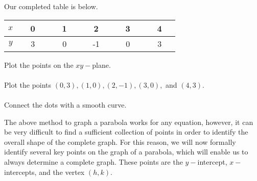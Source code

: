 \documentclass[12pt]{book}
\theoremstyle{definition}
\begin{document}
\begin{multicols}{2}
Our completed table is below.
\begin{center}
	\begin{tabular}{|c|c|c|c|c|c|}
	\hline 
	$x$ & ~~0~~ & ~~1~~ & ~~2~~ & ~~3~~ & ~~4~~\\
	\hline 
	$y$ & 3 & 0 & -1 & 0 & 3\\
	\hline
	\end{tabular}
\end{center}
  Plot the points on the $xy-$plane.\\
~\\
Plot the points $(0, 3), (1, 0), (2, - 1), (3, 0),$ and $(4, 3)$.\\
~\\
Connect the dots with a smooth curve.

\columnbreak

\begin{center}
\end{center}
\end{multicols}
The above method to graph a parabola works for any equation, however, it can be very difficult to find a sufficient collection of points in order to identify the overall shape of the complete graph.  For this reason, we will now formally identify several key points on the graph of a parabola, which will enable us to always determine a complete graph.  These points are the $y-$intercept, $x-$intercepts, and the vertex $(h,k)$.
\end{document}
